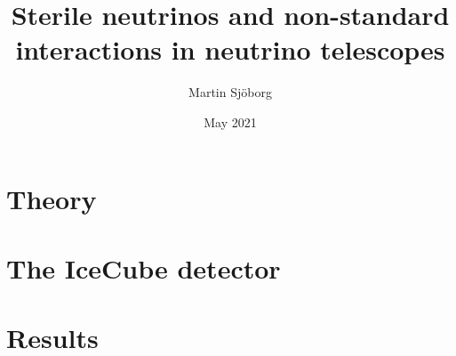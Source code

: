 \documentclass[g5paper,10pt,final,openright,swedish]{thesis}
\title{Sterile neutrinos and non-standard interactions in neutrino telescopes}
\author{Martin Sjöborg}
\date{May 2021}
\begin{document}
\maketitle

\cleardoublepage

%

%

\tableofcontents

%


\mainmatter

\cleardoublepage

\chapter{Theory}\label{ch:theory}
%
%
%
%
\chapter{The IceCube detector}\label{ch:ic}
%
%
%
\chapter{Results}\label{ch:results}
%
%

% 
% 
\end{document}
